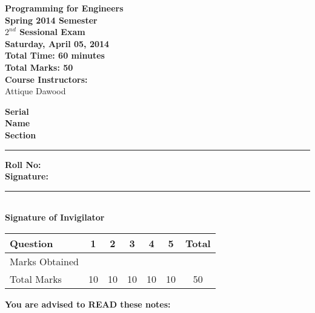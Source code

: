 \documentclass[12pt,a4paper]{article}
\def\QOne{10}
\def\Qtwo{10}
\def\Qthree{10}
\def\Qfour{10}
\def\Qfive{10}
\def\TotalMarks{50}
\begin{document}
\begin{minipage}{0.55\textwidth}
{\LARGE \textbf{Programming for Engineers}}\\[0.15cm]
{\normalsize \textbf{Spring 2014 Semester}}\\
{\Large \textbf{$2^{nd}$ Sessional Exam}}\\
{\normalsize \textbf{Saturday, April 05, 2014}}\\[0.30cm]
{\Large \textbf{Total Time: 60 minutes}}\\[0.15cm]
{\Large \textbf{Total Marks: 50}}\\
\textbf{Course Instructors:}\\
Attique Dawood\\
\end{minipage}
\begin{minipage}{0.4\textwidth}
\textbf{Serial} \hrulefill \\[0.25cm]
\textbf{Name} \hrulefill\\[0.25cm]
\textbf{Section} \rule{1cm}{0.2mm} \textbf{Roll No:} \hrulefill\\[0.25cm]
\textbf{Signature:} \hrulefill\\[0.25cm]
\rule{6.6cm}{0.2mm}\\
\textbf{Signature of Invigilator}\\[0.25cm]
\end{minipage}
\begin{table}[H]
\begin{center}
\vspace{0.3cm}
	{\large \begin{tabular}{|l|c|c|c|c|c|c|}
	\hline
		\rule{0pt}{2.6ex} Question & \textbf{1} & \textbf{2} & \textbf{3} & \textbf{4} & \textbf{5} & \textbf{Total}\\
		\hline
		Marks Obtained \rule{0pt}{2.6ex} & & & & & &\\
		\hline
		Total Marks \rule{0pt}{2.6ex} & \QOne & \Qtwo & \Qthree & \Qfour & \Qfive & \TotalMarks\\
	\hline
	\end{tabular}}
\end{center}
\end{table}
\noindent \textbf{You are advised to READ these notes:}
\end{document}

